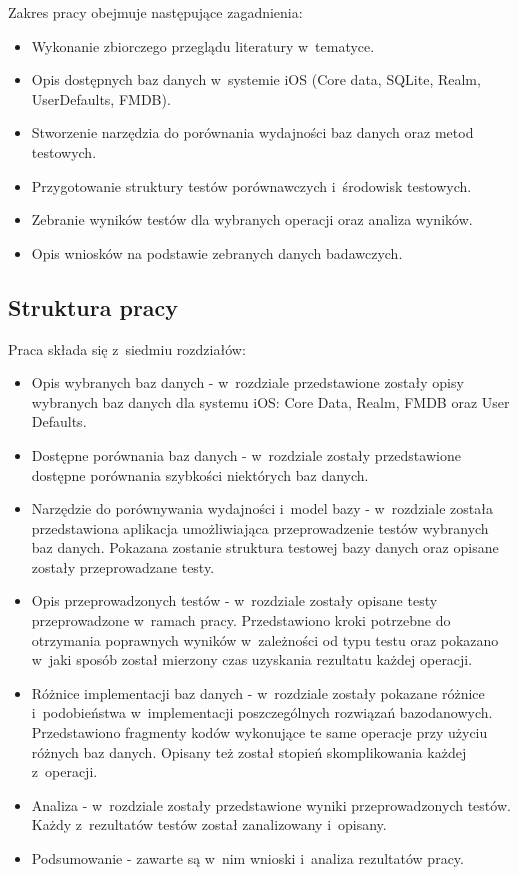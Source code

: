 Zakres pracy obejmuje następujące zagadnienia: 

\begin{itemize}
	\item Wykonanie zbiorczego przeglądu literatury w~tematyce.
	\item Opis dostępnych baz danych w~systemie iOS (Core data, SQLite, Realm, UserDefaults, FMDB).
	\item Stworzenie narzędzia do porównania wydajności baz danych oraz metod testowych.
	\item Przygotowanie struktury testów porównawczych i~środowisk testowych.
	\item Zebranie wyników testów dla wybranych operacji oraz analiza wyników.
	\item Opis wniosków na podstawie zebranych danych badawczych.
\end{itemize}

\subsection{Struktura pracy}

Praca składa się z~siedmiu rozdziałów:

\begin{itemize}
	\item  Opis wybranych baz danych - w~rozdziale przedstawione zostały opisy wybranych baz danych dla systemu iOS: Core Data, Realm, FMDB oraz User Defaults. 
	\item Dostępne porównania baz danych - w~rozdziale zostały przedstawione dostępne porównania szybkości niektórych baz danych.
	\item Narzędzie do porównywania wydajności i~model bazy - w~rozdziale została przedstawiona aplikacja umożliwiająca przeprowadzenie testów wybranych baz danych. Pokazana zostanie struktura testowej bazy danych oraz opisane zostały przeprowadzane testy.
	\item Opis przeprowadzonych testów - w~rozdziale zostały opisane testy przeprowadzone w~ramach pracy. Przedstawiono kroki potrzebne do otrzymania poprawnych wyników w~zależności od typu testu oraz pokazano w~jaki sposób został mierzony czas uzyskania rezultatu każdej operacji. 
		\item Różnice implementacji baz danych -
 w~rozdziale zostały pokazane różnice i~podobieństwa w~implementacji poszczególnych rozwiązań bazodanowych. Przedstawiono fragmenty kodów wykonujące te same operacje przy użyciu różnych baz danych. Opisany też został stopień skomplikowania każdej z~operacji.
	\item Analiza - w~rozdziale zostały przedstawione wyniki przeprowadzonych testów. Każdy z~rezultatów testów został zanalizowany i~opisany.
\item Podsumowanie - zawarte są w~nim wnioski i~analiza rezultatów pracy.
\end{itemize}
